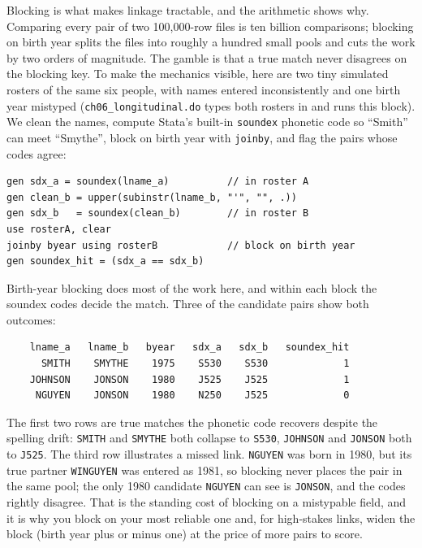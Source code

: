 Blocking is what makes linkage tractable, and the arithmetic shows why. Comparing every pair of two 100{,}000-row files is ten billion comparisons; blocking on birth year splits the files into roughly a hundred small pools and cuts the work by two orders of magnitude. The gamble is that a true match never disagrees on the blocking key. To make the mechanics visible, here are two tiny simulated rosters of the same six people, with names entered inconsistently and one birth year mistyped (\texttt{ch06\_longitudinal.do} types both rosters in and runs this block). We clean the names, compute Stata's built-in \texttt{soundex} phonetic code so \enquote{Smith} can meet \enquote{Smythe}, block on birth year with \texttt{joinby}, and flag the pairs whose codes agree:
\par
{\footnotesize
\begin{verbatim}
gen sdx_a = soundex(lname_a)          // in roster A
gen clean_b = upper(subinstr(lname_b, "'", "", .))
gen sdx_b   = soundex(clean_b)        // in roster B
use rosterA, clear
joinby byear using rosterB            // block on birth year
gen soundex_hit = (sdx_a == sdx_b)
\end{verbatim}
}
Birth-year blocking does most of the work here, and within each block the soundex codes decide the match. Three of the candidate pairs show both outcomes:
\par
{\footnotesize
\begin{verbatim}
    lname_a   lname_b   byear   sdx_a   sdx_b   soundex_hit
      SMITH    SMYTHE    1975    S530    S530             1
    JOHNSON    JONSON    1980    J525    J525             1
     NGUYEN    JONSON    1980    N250    J525             0
\end{verbatim}
}
The first two rows are true matches the phonetic code recovers despite the spelling drift: \texttt{SMITH} and \texttt{SMYTHE} both collapse to \texttt{S530}, \texttt{JOHNSON} and \texttt{JONSON} both to \texttt{J525}. The third row illustrates a missed link. \texttt{NGUYEN} was born in 1980, but its true partner \texttt{WINGUYEN} was entered as 1981, so blocking never places the pair in the same pool; the only 1980 candidate \texttt{NGUYEN} can see is \texttt{JONSON}, and the codes rightly disagree. That is the standing cost of blocking on a mistypable field, and it is why you block on your most reliable one and, for high-stakes links, widen the block (birth year plus or minus one) at the price of more pairs to score.

